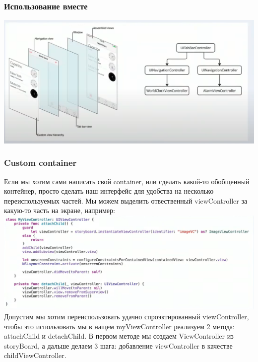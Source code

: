 \documentclass{article}
\begin{document}
    \subsubsection{Использование вместе}
    \includegraphics[scale = 0.5]{pic/Снимок экрана 2023-08-03 в 11.14.45.png}
    \newline
    \subsubsection{Custom container}
    Если мы хотим сами написать свой container, или сделать какой-то обобщенный контейнер, просто сделать наш интерфейс для удобства на несколько переиспользуемых частей. Мы можем выделить отвественный viewController за какую-то часть на экране, например: 
    \newline
    \includegraphics[scale = 0.5]{pic/Снимок экрана 2023-08-03 в 11.17.32.png}
    \newline
    Допустим мы хотим переиспользовать удачно спроэктированный viewController, чтобы это использовать мы в нащем myViewController реализуем 2 метода: attachChild и detachChild. В первом методе мы создаем ViewController из storyBoard, а дальше делаем 3 шага: добавление viewController в качестве childViewController. 
\end{document}

